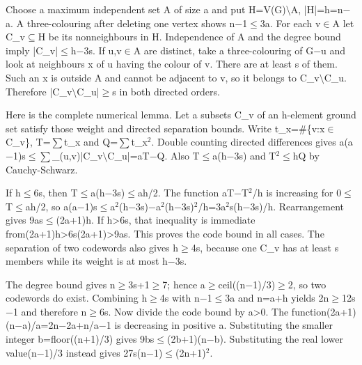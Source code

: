 \documentclass[11pt,a4paper]{article}
\begin{document}
Choose a maximum independent set A of size a and put H=V(G)\ensuremath{\setminus}A, |H|=h=n\ensuremath{-}a. A three-colouring after deleting one vertex shows n\ensuremath{-}1\ensuremath{\leq}3a. For each v\ensuremath{\in}A let C\_v\ensuremath{\subseteq}H be its nonneighbours in H. Independence of A and the degree bound imply |C\_v|\ensuremath{\leq}h\ensuremath{-}3s. If u,v\ensuremath{\in}A are distinct, take a three-colouring of G\ensuremath{-}u and look at neighbours x of u having the colour of v. There are at least s of them. Such an x is outside A and cannot be adjacent to v, so it belongs to C\_v\ensuremath{\setminus}C\_u. Therefore |C\_v\ensuremath{\setminus}C\_u|\ensuremath{\geq}s in both directed orders.

Here is the complete numerical lemma. Let a subsets C\_v of an h-element ground set satisfy those weight and directed separation bounds. Write t\_x=\#\{v:x\ensuremath{\in}C\_v\}, T=\ensuremath{\sum}t\_x and Q=\ensuremath{\sum}t\_x\ensuremath{^2}. Double counting directed differences gives a(a\ensuremath{-}1)s\ensuremath{\leq}\ensuremath{\sum}\_(u,v)|C\_v\ensuremath{\setminus}C\_u|=aT\ensuremath{-}Q. Also T\ensuremath{\leq}a(h\ensuremath{-}3s) and T\ensuremath{^2}\ensuremath{\leq}hQ by Cauchy-Schwarz.

If h\ensuremath{\leq}6s, then T\ensuremath{\leq}a(h\ensuremath{-}3s)\ensuremath{\leq}ah/2. The function aT\ensuremath{-}T\ensuremath{^2}/h is increasing for 0\ensuremath{\leq}T\ensuremath{\leq}ah/2, so a(a\ensuremath{-}1)s\ensuremath{\leq}a\ensuremath{^2}(h\ensuremath{-}3s)\ensuremath{-}a\ensuremath{^2}(h\ensuremath{-}3s)\ensuremath{^2}/h=3a\ensuremath{^2}s(h\ensuremath{-}3s)/h. Rearrangement gives 9as\ensuremath{\leq}(2a+1)h. If h>6s, that inequality is immediate from(2a+1)h>6s(2a+1)>9as. This proves the code bound in all cases. The separation of two codewords also gives h\ensuremath{\geq}4s, because one C\_v has at least s members while its weight is at most h\ensuremath{-}3s.

The degree bound gives n\ensuremath{\geq}3s+1\ensuremath{\geq}7; hence a\ensuremath{\geq}ceil((n\ensuremath{-}1)/3)\ensuremath{\geq}2, so two codewords do exist. Combining h\ensuremath{\geq}4s with n\ensuremath{-}1\ensuremath{\leq}3a and n=a+h yields 2n\ensuremath{\geq}12s\ensuremath{-}1 and therefore n\ensuremath{\geq}6s. Now divide the code bound by a>0. The function(2a+1)(n\ensuremath{-}a)/a=2n\ensuremath{-}2a+n/a\ensuremath{-}1 is decreasing in positive a. Substituting the smaller integer b=floor((n+1)/3) gives 9bs\ensuremath{\leq}(2b+1)(n\ensuremath{-}b). Substituting the real lower value(n\ensuremath{-}1)/3 instead gives 27s(n\ensuremath{-}1)\ensuremath{\leq}(2n+1)\ensuremath{^2}.
\end{document}
